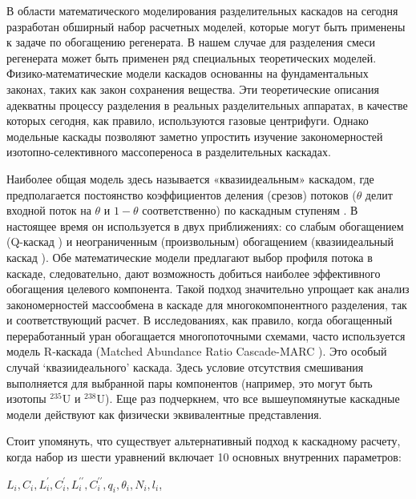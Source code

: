 В области математического моделирования разделительных каскадов на сегодня разработан обширный набор расчетных моделей, которые могут быть применены к задаче по обогащению регенерата. В нашем случае для разделения смеси регенерата может быть применен ряд специальных теоретических моделей. Физико-математические модели каскадов основанны на фундаментальных законах, таких как закон сохранения вещества. Эти теоретические описания адекватны процессу разделения в реальных разделительных аппаратах, в качестве которых сегодня, как правило, используются газовые центрифуги. Однако модельные каскады позволяют заметно упростить изучение закономерностей изотопно-селективного массопереноса в разделительных каскадах.

Наиболее общая модель здесь называется «квазиидеальным» каскадом, где предполагается постоянство коэффициентов деления (срезов) потоков ($\theta$ делит входной поток на $\theta$ и $1 - \theta$ соответственно) по каскадным ступеням \cite{yamamotoMulticomponentIsotopeSeparating1978}. В настоящее время он используется в двух приближениях: со слабым обогащением (Q-каскад \cite{borisevichNewApproachOptimize2011, kolokoltsovDesignCascadesSeparating1970, zengQCascadeExplanation2012}) и неограниченным (произвольным) обогащением (квазиидеальный каскад \cite{sulaberidzeSpecialFeaturesEnrichment2006}). Обе математические модели предлагают выбор профиля потока в каскаде, следовательно, дают возможность добиться наиболее эффективного обогащения целевого компонента. Такой подход значительно упрощает как анализ закономерностей массообмена в каскаде для многокомпонентного разделения, так и соответствующий расчет. В исследованиях, как правило, когда обогащенный переработанный уран обогащается многопоточными схемами, часто используется модель R-каскада (Matched Abundance Ratio Cascade-MARC \cite{delagarzaMulticomponentIsotopeSeparation1961, woodEffectsSeparationProcesses2008, kazukihidaSimultaneousEvaluationEffects}). Это особый случай `квазиидеального' каскада. Здесь условие отсутствия смешивания выполняется для выбранной пары компонентов (например, это могут быть изотопы $^{235}$U и $^{238}$U). Еще раз подчеркнем, что все вышеупомянутые каскадные модели действуют как физически эквивалентные представления. 

Стоит упомянуть, что существует альтернативный подход к каскадному расчету, когда набор из шести уравнений включает 10 основных внутренних параметров:

$L_{i}, C_{i}, L_{i}^{\prime}, C_{i}^{\prime}, L_{i}^{\prime \prime}, C_{i}^{\prime \prime}, q_{i}, \theta_{i}, N_{i}, l_{i}$,

